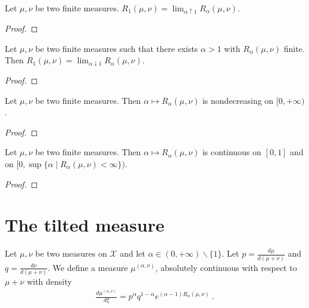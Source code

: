 \begin{lemma}
  \label{lem:renyi_tendsto_renyi_one}
  Let $\mu, \nu$ be two finite measures. $R_1(\mu, \nu) = \lim_{\alpha \uparrow 1} R_\alpha(\mu, \nu)$.
\end{lemma}

\begin{proof}
\end{proof}

\begin{lemma}
  \label{lem:renyi_tendsto_renyi_one_above}
  Let $\mu, \nu$ be two finite measures such that there exists $\alpha > 1$ with $R_\alpha(\mu, \nu)$ finite. Then $R_1(\mu, \nu) = \lim_{\alpha \downarrow 1} R_\alpha(\mu, \nu)$.
\end{lemma}

\begin{proof}
\end{proof}

\begin{lemma}
  \label{lem:renyi_monotone}
  Let $\mu, \nu$ be two finite measures. Then $\alpha \mapsto R_\alpha(\mu, \nu)$ is nondecreasing on $[0, + \infty)$.
\end{lemma}

\begin{proof}
\end{proof}

\begin{lemma}
  \label{lem:renyi_continuous}
  Let $\mu, \nu$ be two finite measures. Then $\alpha \mapsto R_\alpha(\mu, \nu)$ is continuous on $[0, 1]$ and on $[0, \sup \{\alpha \mid R_\alpha(\mu, \nu) < \infty\})$.
\end{lemma}

\begin{proof}
\end{proof}

\section{The tilted measure}

\begin{definition}
  \label{def:renyi_measure}
  \leanok
  Let $\mu, \nu$ be two measures on $\mathcal X$ and let $\alpha \in (0, +\infty) \backslash \{1\}$. Let $p = \frac{d \mu}{d (\mu + \nu)}$ and $q = \frac{d \nu}{d (\mu + \nu)}$. We define a measure $\mu^{(\alpha, \nu)}$, absolutely continuous with respect to $\mu + \nu$ with density
  \begin{align*}
  \frac{d \mu^{(\alpha, \nu)}}{d \xi} = p^\alpha q^{1 - \alpha} e^{(\alpha - 1)R_\alpha(\mu, \nu)} \: .
  \end{align*}
\end{definition}

